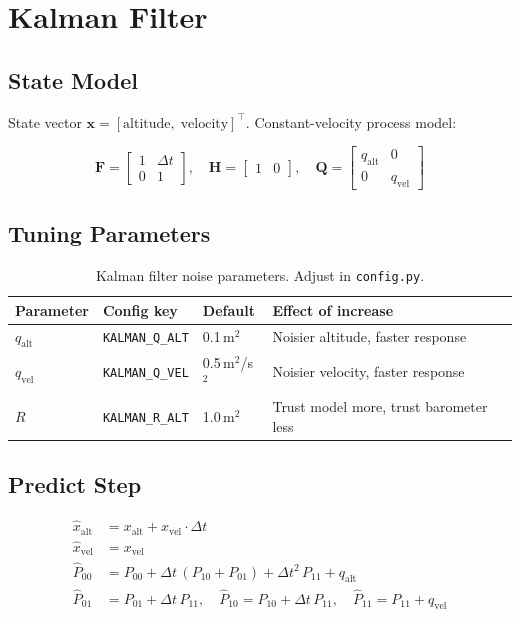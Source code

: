 \documentclass[11pt, a4paper, twoside]{article}
\newcommand{\config}[1]{\texttt{#1}}
\newcommand{\file}[1]{\texttt{#1}}
\begin{document}
\section{Kalman Filter}
\label{sec:kalman}

\subsection{State Model}

State vector $\mathbf{x} = [\text{altitude},\; \text{velocity}]^\top$. Constant-velocity process model:

\begin{equation}
\mathbf{F} = \begin{bmatrix} 1 & \Delta t \\ 0 & 1 \end{bmatrix}, \quad
\mathbf{H} = \begin{bmatrix} 1 & 0 \end{bmatrix}, \quad
\mathbf{Q} = \begin{bmatrix} q_\text{alt} & 0 \\ 0 & q_\text{vel} \end{bmatrix}
\end{equation}

\subsection{Tuning Parameters}

\begin{table}[ht]
\centering
\caption{Kalman filter noise parameters. Adjust in \file{config.py}.}
\label{tab:kalman-params}
\begin{tabular}{l l l l}
\toprule
\textbf{Parameter} & \textbf{Config key} & \textbf{Default} & \textbf{Effect of increase} \\
\midrule
$q_\text{alt}$ & \config{KALMAN\_Q\_ALT} & 0.1\,m$^2$ & Noisier altitude, faster response \\
$q_\text{vel}$ & \config{KALMAN\_Q\_VEL} & 0.5\,m$^2$/s$^2$ & Noisier velocity, faster response \\
$R$ & \config{KALMAN\_R\_ALT} & 1.0\,m$^2$ & Trust model more, trust barometer less \\
\bottomrule
\end{tabular}
\end{table}

\subsection{Predict Step}
\begin{align}
\hat{x}_\text{alt} &= x_\text{alt} + x_\text{vel} \cdot \Delta t \\
\hat{x}_\text{vel} &= x_\text{vel} \\
\hat{P}_{00} &= P_{00} + \Delta t \,(P_{10} + P_{01}) + \Delta t^2\, P_{11} + q_\text{alt} \\
\hat{P}_{01} &= P_{01} + \Delta t\, P_{11}, \quad \hat{P}_{10} = P_{10} + \Delta t\, P_{11}, \quad \hat{P}_{11} = P_{11} + q_\text{vel}
\end{align}
\end{document}
